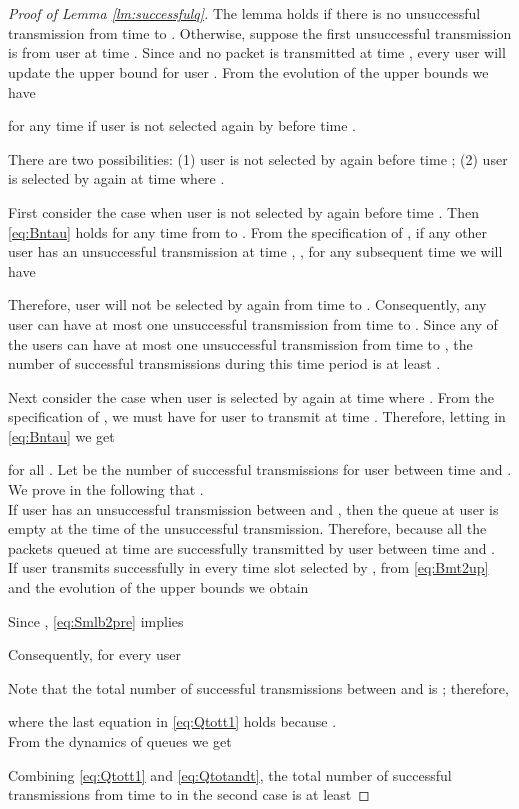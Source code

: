 \documentclass[onecolumn,draftcls]{IEEEtran}
\begin{document}
\section{}
\label{app:lm4}
\begin{proof}[Proof of Lemma \ref{lm:successfulq}]
The lemma holds if there is no unsuccessful transmission from time  to .
Otherwise, suppose the first unsuccessful transmission is from user  at time .
Since  and no packet is transmitted at time , every user will update the upper bound  for user .
From the evolution of the upper bounds we have

for any time  if user  is not selected again by  before time .

There are two possibilities: (1) user  is not selected by  again before time ; (2) user  is selected by  again at time  where .

First consider the case when user  is not selected by  again before time .
Then \eqref{eq:Bntau} holds for any time  from  to . 
From the specification of , if any other user  has an unsuccessful transmission at time , ,
for any subsequent time  we will have

Therefore, user  will not be selected by  again from time  to . Consequently, any user  can have at most one unsuccessful transmission from time  to .
Since any of the  users can have at most one unsuccessful transmission from time  to , the number of successful transmissions during this time period is at least .

Next consider the case when user  is selected by  again at time  where .
From the specification of , we must have  for user  to transmit at time .
Therefore, letting  in \eqref{eq:Bntau} we get

for all .
Let  be the number of successful transmissions for user  between time  and .
We prove in the following that .
\\
If user  has an unsuccessful transmission between  and , then the queue at user  is empty at the time of the unsuccessful transmission. Therefore,
 because all the  packets queued at time  are successfully transmitted by user  between time  and . 
\\
If user  transmits successfully in every time slot selected by , from \eqref{eq:Bmt2up} and the evolution of the upper bounds we obtain

Since , \eqref{eq:Smlb2pre} implies

Consequently, for every user 

Note that the total number of successful transmissions between  and  is ; therefore,

where the last equation in \eqref{eq:Qtott1} holds because .
\\
From the dynamics of queues we get

Combining \eqref{eq:Qtott1} and \eqref{eq:Qtotandt}, the total number of successful transmissions from time  to  in the second case is at least




\end{proof}
\end{document}
